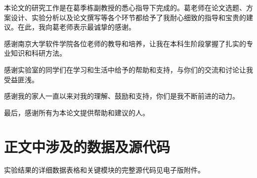\documentclass[
    fontset = win, %
  ]{njuthesis}
\begin{document}
\printbibliography


\begin{acknowledgement}
本论文的研究工作是在葛季栋副教授的悉心指导下完成的。葛老师在论文选题、方案设计、实验分析以及论文撰写等各个环节都给予了我耐心细致的指导和宝贵的建议。在此，我向葛老师表示最诚挚的感谢。

感谢南京大学软件学院各位老师的教导和培养，让我在本科生阶段掌握了扎实的专业知识和科研方法。

感谢实验室的同学们在学习和生活中给予的帮助和支持，与你们的交流和讨论让我受益匪浅。

感谢我的家人一直以来对我的理解、鼓励和支持，你们是我不断前进的动力。

最后，感谢所有为本论文提供帮助和建议的人。
\end{acknowledgement}

\appendix

\chapter{正文中涉及的数据及源代码}


实验结果的详细数据表格和关键模块的完整源代码见电子版附件。

\end{document}

